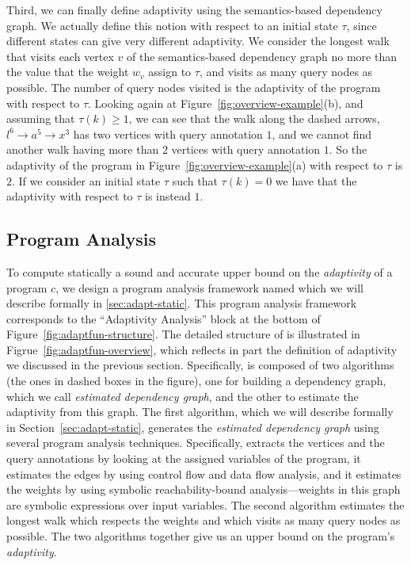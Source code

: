 Third, we can finally define adaptivity using the semantics-based dependency graph. We actually define this notion with respect to an initial state $\tau$, since different states can give very different adaptivity. We consider the longest walk that visits each vertex $v$ of the semantics-based dependency graph no more than the value that the weight $w_v$ assign to $\tau$, and visits as many query nodes as possible. The number of query nodes visited is the adaptivity of the program with respect to $\tau$.
Looking again at Figure~\ref{fig:overview-example}(b), and assuming that $\tau(k) \geq 1$, we can see that the 
walk along the dashed arrows, $l^{6} \to a^5 \to x^3 $ has two vertices with query annotation $1$, and we cannot find another walk having more than $2$ vertices with query annotation $1$. So the adaptivity of the program in Figure~\ref{fig:overview-example}(a) with respect to $\tau$ is $2$. If we consider an initial state $\tau$ such that $\tau(k)=0$ we have that the adaptivity with respect to $\tau$ is instead $1$. 

\subsection{Program Analysis}
To compute statically a sound and accurate upper bound on the \emph{adaptivity} of a program $c$,
we design a program analysis framework named {\THESYSTEM} which we will describe formally in \ref{sec:adapt-static}. 
This program analysis framework corresponds to the ``Adaptivity Analysis'' block at the bottom of Figure~\ref{fig:adaptfun-structure}.
The detailed structure of {\THESYSTEM} is illustrated in Figrue~\ref{fig:adaptfun-overview}, which reflects in part the definition of adaptivity we discussed in the previous section. Specifically, {\THESYSTEM} is composed of two algorithms (the ones in dashed boxes in the figure), one for building a dependency graph, which we call \emph{estimated dependency graph}, and the other to estimate the adaptivity from this graph. 
The first algorithm, which we will describe formally in Section~\ref{sec:adapt-static}, generates the \emph{estimated dependency graph} using several program analysis techniques. Specifically, {\THESYSTEM} extracts the vertices and the query annotations by looking at the assigned variables of the program, it estimates the edges by using control flow and data flow analysis, and it estimates the weights by using symbolic reachability-bound analysis---weights in this graph are symbolic expressions over input variables. 
The second algorithm estimates the longest walk which respects the weights and which visits as many query nodes as possible. 
The two algorithms together give us an upper bound on the program's \emph{adaptivity}.


